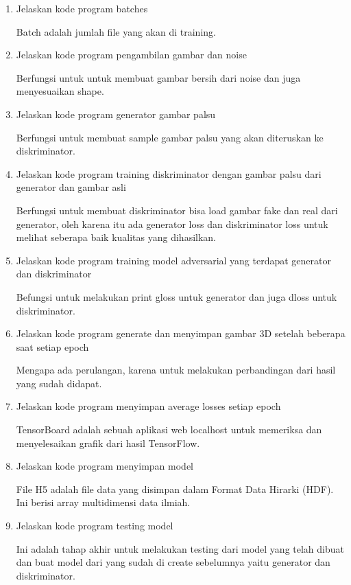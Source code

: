 \begin{enumerate}
\item Jelaskan kode program batches
	
	Batch adalah jumlah file yang akan di training.

\item Jelaskan kode program pengambilan gambar dan noise
	
	Berfungsi untuk untuk membuat gambar bersih dari noise dan juga menyesuaikan shape.

\item Jelaskan kode program generator gambar palsu
	
	Berfungsi untuk membuat sample gambar palsu yang akan diteruskan ke diskriminator.
	
\item Jelaskan kode program training diskriminator dengan gambar palsu dari generator dan gambar asli
	
	Berfungsi untuk membuat diskriminator bisa load gambar fake dan real dari generator, oleh karena itu ada generator loss dan diskriminator loss untuk melihat seberapa baik kualitas yang dihasilkan.

\item Jelaskan kode program training model adversarial yang terdapat generator dan diskriminator

	Befungsi untuk melakukan print gloss untuk generator dan juga dloss untuk diskriminator.

\item Jelaskan kode program  generate dan menyimpan gambar 3D setelah beberapa saat setiap epoch
	
	Mengapa ada perulangan, karena untuk melakukan perbandingan dari hasil yang sudah didapat.

\item Jelaskan kode program  menyimpan average losses setiap epoch
	
	TensorBoard adalah sebuah aplikasi web localhost untuk memeriksa dan menyelesaikan grafik dari hasil TensorFlow.

\item Jelaskan kode program menyimpan model
	
	File H5 adalah file data yang disimpan dalam Format Data Hirarki (HDF). Ini berisi array multidimensi data ilmiah.

\item Jelaskan kode program testing model
	
	Ini adalah tahap akhir untuk melakukan testing dari model yang telah dibuat dan buat model dari yang sudah di create sebelumnya yaitu generator dan diskriminator.

\end{enumerate}


